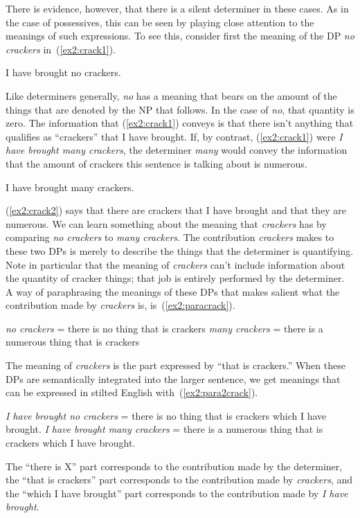 There is evidence, however, that there is a silent determiner in these cases. As in the case of possessives, this can be seen by playing close attention to the meanings of such expressions. To see this, consider first the meaning of the DP \emph{no crackers} in~(\ref{ex2:crack1}).
\begin{exe}
	\raggedright
	\ex \label{ex2:crack1} 
	I have brought no crackers.
\end{exe}
Like determiners generally, \emph{no} has a meaning that bears on the amount of the things that are denoted by the NP that follows. In the case of \emph{no}, that quantity is zero. The information that (\ref{ex2:crack1}) conveys is that there isn't anything that qualifies as ``crackers'' that I have brought. If, by contrast, (\ref{ex2:crack1}) were \emph{I have brought many crackers}, the determiner \emph{many} would convey the information that the amount of crackers this sentence is talking about is numerous. 
\begin{exe}
	\raggedright
	\ex \label{ex2:crack2} 
	I have brought many crackers.
\end{exe}
(\ref{ex2:crack2}) says that there are crackers that I have brought and that they are numerous. We can learn something about the meaning that \emph{crackers} has by comparing \emph{no crackers} to \emph{many crackers}. The contribution \emph{crackers} makes to these two DPs is merely to describe the things that the determiner is quantifying. Note in particular that the meaning of \emph{crackers} can't include information about the quantity of cracker things; that job is entirely performed by the determiner. A way of paraphrasing the meanings of these DPs that makes salient what the contribution made by \emph{crackers} is, is~(\ref{ex2:paracrack}).
\begin{exe}
	\raggedright
	\ex \label{ex2:paracrack} 
	\begin{xlist}
		\ex \emph{no crackers} = there is no thing that is crackers
		\ex \emph{many crackers} = there is a numerous thing that is crackers
	\end{xlist}
\end{exe}
The meaning of \emph{crackers} is the part expressed by ``that is crackers.'' When these DPs are semantically integrated into the larger sentence, we get meanings that can be expressed in stilted English with~(\ref{ex2:para2crack}).
\begin{exe}
	\raggedright
	\ex \label{ex2:para2crack} 
	\begin{xlist}
		\ex \emph{I have brought no crackers} = there is no thing that is crackers which I have brought.
		\ex \emph{I have brought many crackers} = there is a numerous thing that is crackers which I have brought.
	\end{xlist}
\end{exe}
The ``there is X'' part corresponds to the contribution made by the determiner, the ``that is crackers'' part corresponds to the contribution made by \emph{crackers}, and the ``which I have brought'' part corresponds to the contribution made by \emph{I have brought}.

